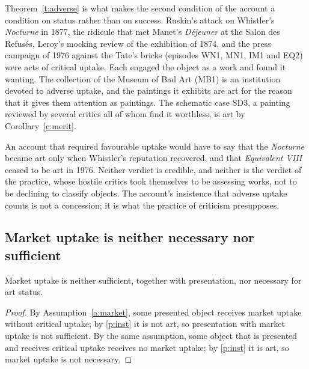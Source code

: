 \documentclass{situationist-preprint}
\begin{document}
Theorem~\ref{t:adverse} is what makes the second condition of the account a condition on status rather than on success. Ruskin's attack on Whistler's \emph{Nocturne} in 1877, the ridicule that met Manet's \emph{D\'ejeuner} at the Salon des Refus\'es, Leroy's mocking review of the exhibition of 1874, and the press campaign of 1976 against the Tate's bricks (episodes WN1, MN1, IM1 and EQ2) were acts of critical uptake. Each engaged the object as a work and found it wanting. The collection of the Museum of Bad Art (MB1) is an institution devoted to adverse uptake, and the paintings it exhibits are art for the reason that it gives them attention as paintings. The schematic case SD3, a painting reviewed by several critics all of whom find it worthless, is art by Corollary~\ref{c:merit}.

An account that required favourable uptake would have to say that the \emph{Nocturne} became art only when Whistler's reputation recovered, and that \emph{Equivalent VIII} ceased to be art in 1976. Neither verdict is credible, and neither is the verdict of the practice, whose hostile critics took themselves to be assessing works, not to be declining to classify objects. The account's insistence that adverse uptake counts is not a concession; it is what the practice of criticism presupposes.

\subsection{Market uptake is neither necessary nor sufficient}

\begin{proposition}\label{p:market}
Market uptake is neither sufficient, together with presentation, nor necessary for art status.
\end{proposition}

\begin{proof}
By Assumption~\ref{a:market}, some presented object receives market uptake without critical uptake; by \ref{p:inst} it is not art, so presentation with market uptake is not sufficient. By the same assumption, some object that is presented and receives critical uptake receives no market uptake; by \ref{p:inst} it is art, so market uptake is not necessary.
\end{proof}
\end{document}
